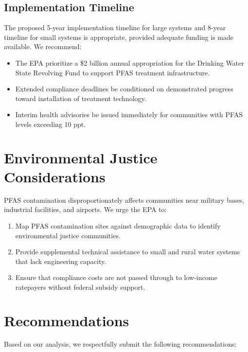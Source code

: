 \documentclass[
    language=english,
    doctype=public-comment,
    institution=none,
]{../../omnilatex}
\begin{document}
\subsection{Implementation Timeline}

The proposed 5-year implementation timeline for large systems and 8-year
timeline for small systems is appropriate, provided adequate funding is
made available. We recommend:

\begin{itemize}
    \item The EPA prioritize a \$2 billion annual appropriation for the
          Drinking Water State Revolving Fund to support PFAS treatment
          infrastructure.
    \item Extended compliance deadlines be conditioned on demonstrated
          progress toward installation of treatment technology.
    \item Interim health advisories be issued immediately for communities
          with PFAS levels exceeding 10 ppt.
\end{itemize}

\section{Environmental Justice Considerations}

PFAS contamination disproportionately affects communities near military
bases, industrial facilities, and airports. We urge the EPA to:

\begin{enumerate}
    \item Map PFAS contamination sites against demographic data to
          identify environmental justice communities.
    \item Provide supplemental technical assistance to small and rural
          water systems that lack engineering capacity.
    \item Ensure that compliance costs are not passed through to low-income
          ratepayers without federal subsidy support.
\end{enumerate}

\section{Recommendations}

Based on our analysis, we respectfully submit the following recommendations:
\end{document}
